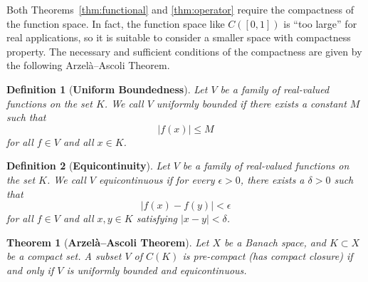 \documentclass[11pt]{article}
\newtheorem{theorem}{Theorem}
\newtheorem{lemma}[theorem]{Lemma}
\newtheorem{definition}{Definition}
\begin{document}
Both Theorems~\ref{thm:functional} and \ref{thm:operator} require the compactness of the function space. In fact, the function space like $C([0, 1])$ is ``too large'' for real applications, so it is suitable to consider a smaller space with compactness property. The necessary and sufficient conditions of the compactness are given by the following Arzelà–Ascoli Theorem.

\begin{definition}[\textbf{Uniform Boundedness}]
Let $V$ be a family of real-valued functions on the set $K$. We call $V$ uniformly bounded if there exists a constant $M$ such that
$$|f(x)| \leq M$$
for all $f \in V$ and all $x \in K$.
\end{definition}

\begin{definition}[\textbf{Equicontinuity}]
Let $V$ be a family of real-valued functions on the set $K$. We call $V$ equicontinuous if for every $\epsilon > 0$, there exists a $\delta > 0$ such that
$$|f(x)-f(y)| < \epsilon$$
for all $f \in V$ and all $x, y \in K$ satisfying $|x-y| < \delta$.
\end{definition}

\begin{theorem}[\textbf{Arzelà–Ascoli Theorem}]
Let $X$ be a Banach space, and $K \subset X$ be a compact set. A subset $V$ of $C(K)$ is pre-compact (has compact closure) if and only if
$V$ is uniformly bounded and equicontinuous.
\end{theorem}




\end{document}

